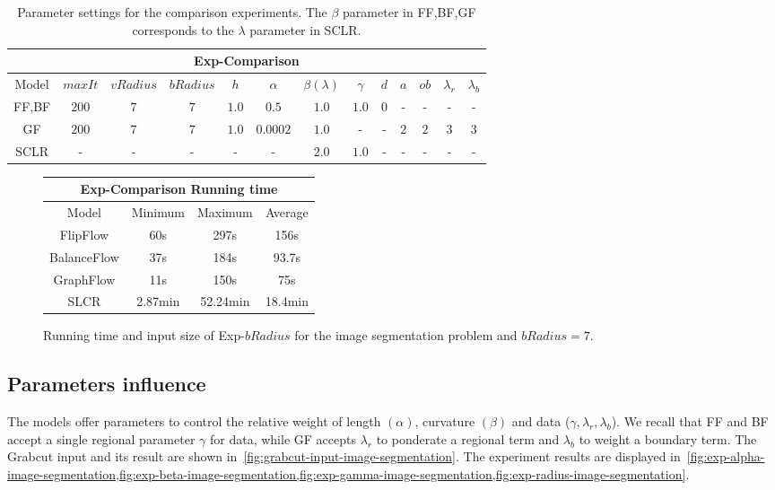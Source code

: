 \begin{table}
\centering
\begin{tabular}{|c|c|c|c|c|c|c|c|c|c|c|c|c|}
\hline
\multicolumn{13}{|c|}{Exp-Comparison}\\
\hline
Model & $maxIt$ & $vRadius$ & $bRadius$ & $h$ & $\alpha$ & $\beta (\lambda)$  & $\gamma$ & $d$ & $a$ & $ob$ & $\lambda_r$ & $\lambda_b$ \\
\hline
FF,BF & $200$ & $7$ & $7$ & $1.0$ & $0.5$ & $1.0$ & $1.0$ & $0$ & - & - & - & -\\
\hline
GF & $200$ & $7$ & $7$ & $1.0$ & $0.0002$ & $1.0$ & - & - & $2$ & $2$ & $3$ & $3$\\
\hline
SCLR & - & - & - & - & - & $2.0$ & $1.0$ & - & - & - & - & -\\
\hline
\end{tabular}
\caption{Parameter settings for the comparison experiments. The $\beta$ parameter in FF,BF,GF corresponds to the $\lambda$ parameter in SCLR.}
\label{tab:image-segmentation-comparison-summary}
\end{table}

\begin{figure}
\center
\captionsetup{type=table}
\begin{tabular}{|c|c|c|c|}
\hline
\multicolumn{4}{|c|}{Exp-Comparison Running time}\\
\hline
Model & Minimum & Maximum & Average \\
\hline
FlipFlow & 60s & 297s & 156s\\
BalanceFlow & 37s & 184s & 93.7s\\
GraphFlow & 11s & 150s & 75s\\
SLCR & 2.87min & 52.24min & 18.4min\\
\hline
\end{tabular}
\caption{Running time and input size of Exp-$bRadius$ for the image segmentation problem and $bRadius=7$.}
\label{tab:rtime-image-segmentation-general} 
\end{figure}

\subsection{Parameters influence}
The models offer parameters to control the relative weight of length $(\alpha)$, curvature $(\beta)$ and data ($\gamma,\lambda _r, \lambda _b$). We recall that FF and BF accept a single regional parameter $\gamma$ for data, while GF accepts $\lambda _r$ to ponderate a regional term and $\lambda _b$ to weight a boundary term. The Grabcut input and its result are shown in~\cref{fig:grabcut-input-image-segmentation}. The experiment results are displayed in~\cref{fig:exp-alpha-image-segmentation,fig:exp-beta-image-segmentation,fig:exp-gamma-image-segmentation,fig:exp-radius-image-segmentation}. 

